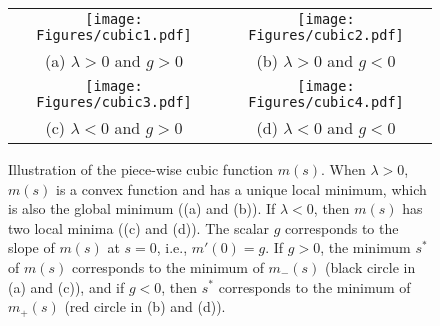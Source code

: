 \begin{figure}[ht!]
	\begin{tabular}{cc}
	\texttt{[image: Figures/cubic1.pdf]} &
	\texttt{[image: Figures/cubic2.pdf]}  \\
	(a) $\lambda > 0$ and $g > 0$ & (b) $\lambda > 0$ and $g < 0$ \\
	\texttt{[image: Figures/cubic3.pdf]} &
	\texttt{[image: Figures/cubic4.pdf]} \\
	(c) $\lambda < 0$ and $g > 0$ & (d)  $\lambda < 0$ and $g < 0$
	\end{tabular}
	\caption{Illustration of the piece-wise cubic function $m(s)$. When $\lambda > 0$, 
	$m(s)$ is a convex function and has a unique local minimum, which is also the global minimum 
	((a) and (b)).
	If $\lambda < 0$, then $m(s)$ has two local minima ((c) and (d)).
	The scalar $g$ corresponds to the slope of $m(s)$ at $s = 0$, i.e., $m'(0) = g$.
	If $g > 0$, the minimum $s^*$ of $m(s)$
	corresponds to the minimum of $m_-(s)$ (black circle in (a) and (c)), 	
	and if $g < 0$, then $s^*$ corresponds to the minimum of $m_+(s)$ (red circle in (b) and (d)).
	\label{fig:cubic}}
\end{figure}







